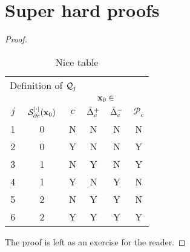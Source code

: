 \section{Super hard proofs}\label{sec:app:exact_dr}

\thmimportant*
\begin{proof}
  \begin{table}
    \centering
    \begin{tabular}{cccccc}
      \toprule
      \multicolumn{3}{c}{Definition of $\mathcal{Q}_j$} & \multicolumn{3}{c}{} \\
      \cmidrule{1-3}
       & & \multicolumn{4}{c}{$\boldsymbol{\mathbf{x}}_0 \in$} \\
      \cmidrule{3-6}
      $j$ & $\mathcal{S}^{\left\lvert \cdot \right\rvert}_{\partial c}(\boldsymbol{\mathbf{x}}_0)$ & $c$ & ${\bar{{\Delta}}}^+_c$ & ${\bar{{\Delta}}}^-_c$ & $\mathcal{P}_c$\\ \midrule
      1 & 0 & N & N & N & N \\
      2 & 0 & Y & N & N & Y \\
      3 & 1 & N & Y & N & Y \\
      4 & 1 & Y & N & Y & N \\
      5 & 2 & N & Y & Y & N \\
      6 & 2 & Y & Y & Y & Y \\
      \bottomrule
    \end{tabular}
    \caption{Nice table}
  \end{table}
  The proof is left as an exercise for the reader.
\end{proof}
